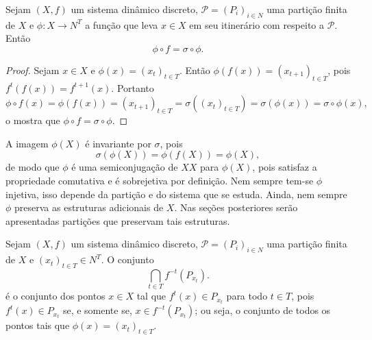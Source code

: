 \begin{proposition}
Sejam $(X,f)$ um sistema dinâmico discreto, $\mathcal P=(P_i)_{i \in N}$ uma partição finita de $X$ e $\phi: X \to N^T$ a função que leva $x \in X$ em seu itinerário com respeito a $\mathcal P$. Então
	\begin{equation*}
	\phi \circ f = \sigma \circ \phi.
	\end{equation*}
\end{proposition}
\begin{proof}
Sejam $x \in X$ e $\phi(x) = (x_t)_{t \in T}$. Então $\phi(f(x)) = (x_{t+1})_{t \in T}$, pois $f^t(f(x)) = f^{t+1}(x)$. Portanto
	\begin{equation*}
	\phi \circ f(x) = \phi(f(x)) = (x_{t+1})_{t \in T} = \sigma ((x_t)_{t \in T}) = \sigma(\phi(x)) = \sigma \circ \phi (x),
	\end{equation*}
o mostra que $\phi \circ f = \sigma \circ \phi$.
\end{proof}

A imagem $\phi(X)$ é invariante por $\sigma$, pois
	\begin{equation*}
	\sigma(\phi(X)) = \phi(f(X)) = \phi(X),
	\end{equation*}
de modo que $\phi$ é uma semiconjugação de $X$\(X\) para $\phi(X)$, pois satisfaz a propriedade comutativa e é sobrejetiva por definição. Nem sempre tem-se $\phi$ injetiva, isso depende da partição e do sistema que se estuda. Ainda, nem sempre $\phi$ preserva as estruturas adicionais de $X$. Nas seções posteriores serão apresentadas partições que preservam tais estruturas.

Sejam $(X,f)$ um sistema dinâmico discreto, $\mathcal P=(P_i)_{i \in N}$ uma partição finita de $X$ e $(x_t)_{t \in T} \in N^T$. O conjunto
	\begin{equation*}
	\bigcap_{t \in T} f^{-t}(P_{x_t}).
	\end{equation*}
é o conjunto dos pontos $x \in X$ tal que $f^t(x) \in P_{x_t}$ para todo $t \in T$, pois $f^t(x) \in P_{x_t}$ se, e somente se, $x \in f^{-t}(P_{x_t})$; ou seja, o conjunto de todos os pontos tais que $\phi(x)=(x_t)_{t \in T}$.


